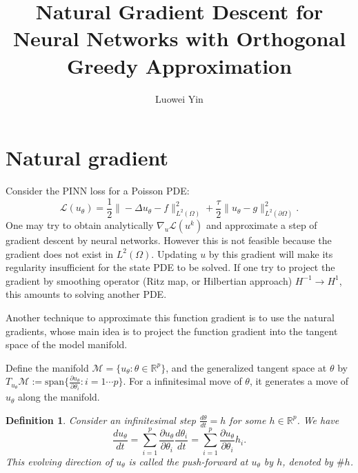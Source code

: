 \documentclass{article}
\title{Natural Gradient Descent for Neural Networks with Orthogonal Greedy Approximation}
\author{Luowei Yin}
\newtheorem{definition}{Definition}
\begin{document}
\maketitle

\section{Natural gradient}

Consider the PINN loss for a Poisson PDE:
\[
    \mathcal{L}(u_\theta)=\frac{1}{2}\|-\Delta u_\theta - f\|^2_{L^2(\Omega)} + \frac{\tau}{2}\|u_\theta-g\|^2_{L^2(\partial\Omega)}.
\]
One may try to obtain analytically $\nabla_u \mathcal{L}(u^k)$ and approximate a step of gradient descent by neural networks. 
However this is not feasible because the gradient does not exist in $L^2(\Omega)$. %
Updating $u$ by this gradient will make its regularity insufficient for the state PDE to be solved. If one try to project the gradient by smoothing operator (Ritz map, or Hilbertian approach) $H^{-1}\to H^1$, this amounts to solving another PDE.

Another technique to approximate this function gradient is to use the natural gradients, whose main idea is to project the function gradient into the tangent space of the model manifold. 

Define the manifold $\mathcal{M} = \{u_\theta:\theta\in\mathbb{R}^p\}$,  and the generalized tangent space at $\theta$ by $T_{u_\theta}\mathcal{M}:=\text{span}\{\frac{\partial u_\theta}{\partial\theta_i}:i=1\cdots p\}$. For a infinitesimal move of $\theta$, it generates a move of $u_\theta$ along the manifold. 

\begin{definition}
    Consider an infinitesimal step $\frac{d\theta}{dt}=h$ for some $h\in\mathbb{R}^p$. We have 
    \[ 
        \frac{d u_\theta}{dt}=\sum_{i=1}^p \frac{\partial u_\theta}{\partial \theta_i}\frac{d\theta_i}{dt}=\sum_{i=1}^p \frac{\partial u_\theta}{\partial \theta_i}h_i.
        \] 
    This evolving direction of $u_\theta$ is called the push-forward at $u_\theta$ by $h$, denoted by $\#h$.
\end{definition}
\end{document}
